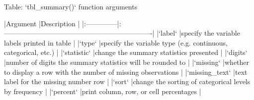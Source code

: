 Table: `tbl_summary()` function arguments

|Argument       |Description                                                      |
|:--------------|:----------------------------------------------------------------|
|`label`        |specify the variable labels printed in table                     |
|`type`         |specify the variable type (e.g. continuous, categorical, etc.)   |
|`statistic`    |change the summary statistics presented                          |
|`digits`       |number of digits the summary statistics will be rounded to       |
|`missing`      |whether to display a row with the number of missing observations |
|`missing_text` |text label for the missing number row                            |
|`sort`         |change the sorting of categorical levels by frequency            |
|`percent`      |print column, row, or cell percentages                           |
